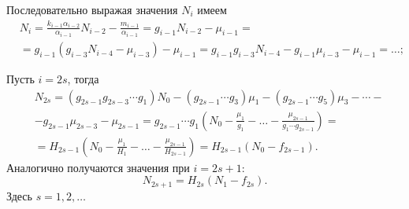     Последовательно выражая значения \(N_{i}\) имеем
    \begin{equation*}
        \begin{split}
            & N_{i} = \frac{k_{i-1} \alpha_{i-2}}{\alpha_{i-1}} N_{i-2} - \frac{m_{i-1}}{\alpha_{i-1}} = g_{i-1} N_{i-2} - \mu_{i-1} =\\ 
            &= g_{i-1} \left( g_{i-3} N_{i-4} - \mu_{i-3} \right) - \mu_{i-1} = g_{i-1} g_{i-3} N_{i-4} - g_{i-1} \mu_{i-3} - \mu_{i-1} = \dots ;
        \end{split}
    \end{equation*}

    Пусть \(i = 2s\), тогда
    \begin{equation} \label{flow_2s}
        \begin{split}
        & N_{2s} = ( g_{2s-1} g_{2s-3} \cdots g_1 ) N_0 - ( g_{2s-1} \cdots g_3 ) \mu_1 - ( g_{2s-1} \cdots g_5 ) \mu_3 - \cdots - \\
        & - g_{2s-1} \mu_{2s-3} - \mu_{2s-1} = g_{2s-1} \cdots g_1 \left( N_0 - \frac{\mu_1}{g_1} - \dots - \frac{\mu_{2s-1}}{g_1 \cdots g_{2s-1}} \right) = \\
        & = H_{2s-1} \left( N_0 - \frac{\mu_1}{H_1} - \dots - \frac{\mu_{2s-1}}{H_{2s-1}} \right)
        = H_{2s-1} \left( N_0 - f_{2s-1} \right).
        \end{split}
    \end{equation}
    Аналогично получаются значения при \(i = 2s + 1\): 
    \begin{equation} \label{flow_2s1}
        N_{2s+1} = H_{2s} (N_1 - f_{2s}).
    \end{equation}
    Здесь \( s=1,2,\ldots \)

